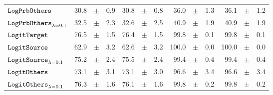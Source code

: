 \documentclass[../main.tex]{subfiles}
\begin{document}
\begin{tabular}{lrrrrrrrrrrrr}
$\mathtt{LogPrbOthers}_{}$              & 30.8                            & $\pm$                                        & 0.9                        & 30.8                                                                                   & $\pm$ & 0.8                                & 36.0  & $\pm$ & 1.3             & 36.1  & $\pm$ & 1.2                           \\
$\mathtt{LogPrbOthers}_{\lambda=0.1}$   & 32.5                            & $\pm$                                        & 2.3                        & 32.6                                                                                   & $\pm$ & 2.5                                & 40.9  & $\pm$ & 1.9             & 40.9  & $\pm$ & 1.9                           \\
\rowcolor{lightgray}
$\mathtt{LogitTarget}$                 & 76.5                            & $\pm$                                        & 1.5                        & 76.4                                                                                     & $\pm$ & 1.5                                & 99.8  & $\pm$ & 0.1             & 99.8  & $\pm$ & 0.1                           \\
\rowcolor{lightgray}
$\mathtt{LogitSource}_{}$               & 62.9                            & $\pm$                                        & 3.2                        & 62.6                                                                                   & $\pm$ & 3.2                                & 100.0 & $\pm$ & 0.0             & 100.0 & $\pm$ & 0.0                           \\
\rowcolor{lightgray}
$\mathtt{LogitSource}_{\lambda=0.1}$    & 75.2                            & $\pm$                                        & 2.4                        & 75.5                                                                                   & $\pm$ & 2.4                                & 99.4  & $\pm$ & 0.4             & 99.4  & $\pm$ & 0.4                           \\
\rowcolor{lightgray}
$\mathtt{LogitOthers}_{}$               & 73.1                            & $\pm$                                        & 3.1                        & 73.1                                                                                 & $\pm$ & 3.0                                & 96.6  & $\pm$ & 3.4             & 96.6  & $\pm$ & 3.4                           \\
\rowcolor{lightgray}
$\mathtt{LogitOthers}_{\lambda=0.1}$    & 76.3                            & $\pm$                                        & 1.6                        & 76.1                                                                                   & $\pm$ & 1.6                                & 99.8  & $\pm$ & 0.2             & 99.8  & $\pm$ & 0.2                           \\

\end{tabular}
\end{document}
